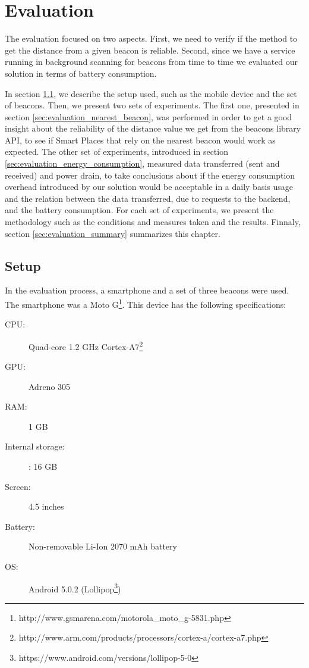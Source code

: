 
\chapter{Evaluation}
\label{chapter:evaluation}
The evaluation focused on two aspects.
First, we need to verify if the method to get the distance from a given beacon is reliable.
Second, since we have a service running in background scanning for beacons from time to time we evaluated our solution in terms of battery consumption.

In section \ref{sec:evaluation_setup}, we describe the setup used, such as the mobile device and the set of beacons.
Then, we present two sets of experiments.
The first one, presented in section \ref{sec:evaluation_nearest_beacon}, was performed in order to get a good insight about the reliability of the distance value we get from the beacons library \gls{API}, to see if Smart Places that rely on the nearest beacon would work as expected.
The other set of experiments, introduced in section \ref{sec:evaluation_energy_consumption}, measured data transferred (sent and received) and power drain, to take conclusions about if the energy consumption overhead introduced by our solution would be acceptable in a daily basis usage and the relation between the data transferred, due to requests to the backend, and the battery consumption.
For each set of experiments, we present the methodology such as the conditions and measures taken and the results.
Finnaly, section \ref{sec:evaluation_summary} summarizes this chapter.

\section{Setup}
\label{sec:evaluation_setup}
In the evaluation process, a smartphone and a set of three beacons were used.
The smartphone was a 
Moto G\footnote{http://www.gsmarena.com/motorola\_moto\_g-5831.php}.
This device has the following specifications:
\begin{description}
  \item[\gls{CPU}:] Quad-core 1.2 GHz Cortex-A7\footnote{http://www.arm.com/products/processors/cortex-a/cortex-a7.php}
  \item[\gls{GPU}:] Adreno 305
  \item[\gls{RAM}:] 1 \gls{GB}
  \item[Internal storage:]: 16 \gls{GB}
  \item[Screen:] 4.5 inches
  \item[Battery:] Non-removable Li-Ion 2070 \gls{mAh} battery
  \item[\gls{OS}:] Android 5.0.2 (Lollipop\footnote{https://www.android.com/versions/lollipop-5-0})
\end{description}


